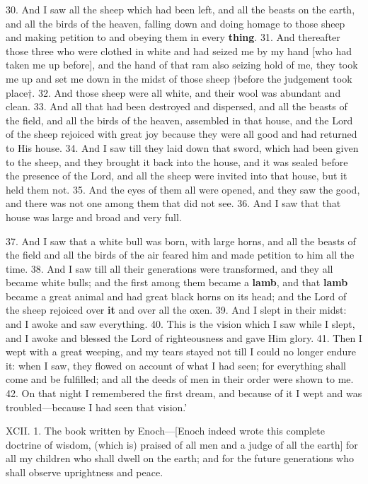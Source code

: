 30. And I saw all the sheep which had been left,
and all the beasts on the earth, and all the birds of
the heaven, falling down and doing homage to those
sheep and making petition to and obeying them in
every \textbf{thing}. 31. And thereafter those three who
were clothed in white and had seized me by my hand
[who had taken me up before], and the hand of that
ram also seizing hold of me, they took me up and set
me down in the midst of those sheep †before the judgement
took place†. 32. And those sheep were all white,
and their wool was abundant and clean. 33. And all
that had been destroyed and dispersed, and all the
beasts of the field, and all the birds of the heaven,
assembled in that house, and the Lord of the sheep
rejoiced with great joy because they were all good and
had returned to His house. 34. And I saw till they
laid down that sword, which had been given to the
sheep, and they brought it back into the house, and
it was sealed before the presence of the Lord, and all
the sheep were invited into that house, but it held
them not. 35. And the eyes of them all were opened,
and they saw the good, and there was not one among
them that did not see. 36. And I saw that that
house was large and broad and very full.

37. And I saw that a white bull was born, with
large horns, and all the beasts of the field and all
the birds of the air feared him and made petition to
him all the time. 38. And I saw till all their generations
were transformed, and they all became white
bulls; and the first among them became a \textbf{lamb}, and
that \textbf{lamb} became a great animal and had great black
horns on its head; and the Lord of the sheep rejoiced
over \textbf{it} and over all the oxen. 39. And I slept in their
midst: and I awoke and saw everything. 40. This
is the vision which I saw while I slept, and I awoke
and blessed the Lord of righteousness and gave Him
glory. 41. Then I wept with a great weeping, and
my tears stayed not till I could no longer endure it:
when I saw, they flowed on account of what I had
seen; for everything shall come and be fulfilled; and
all the deeds of men in their order were shown to me.
42. On that night I remembered the first dream, and
because of it I wept and was troubled—because I
had seen that vision.’



XCII. 1. The book written by Enoch—[Enoch
indeed wrote this complete doctrine of wisdom, (which
is) praised of all men and a judge of all the earth]
for all my children who shall dwell on the earth;
and for the future generations who shall observe
uprightness and peace.

